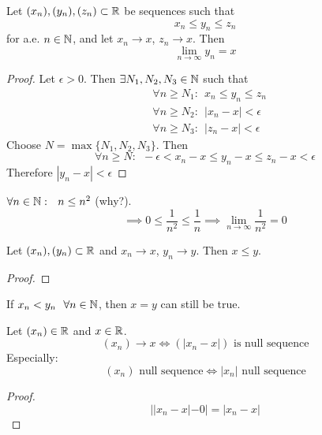 \documentclass[../../script.tex]{subfiles}
\begin{document}
\begin{thm}
Let $(x_n), (y_n), (z_n) \subset \mathbb{R}$ be sequences such that
\[
	x_n \le y_n \le z_n
\]
for a.e. $n \in \mathbb{N}$, and let $x_n \rightarrow x$, $z_n \rightarrow x$. Then
\[
	\lim_{n \rightarrow \infty} y_n = x
\]
\end{thm}
\begin{proof}
Let $\epsilon > 0$. Then $\exists N_1, N_2, N_3 \in \mathbb{N}$ such that
\begin{align}
	&\forall n \ge N_1: ~~x_n \le y_n \le z_n \\
	&\forall n \ge N_2: ~~|x_n - x| < \epsilon \\
	&\forall n \ge N_3: ~~|z_n - x| < \epsilon
\end{align}
Choose $N = \max \{N_1, N_2, N_3\}$. Then
\begin{equation}
	\forall n \ge N: ~~-\epsilon < x_n - x \le y_n - x \le z_n - x < \epsilon
\end{equation}
Therefore $|y_n - x| < \epsilon$
\end{proof}

\begin{eg}
$\forall n \in \mathbb{N}: ~~n \le n^2$ (why?).
\[
	\implies 0 \le \frac{1}{n^2} \le \frac{1}{n} \implies \lim_{n \rightarrow \infty} \frac{1}{n^2} = 0
\]
\end{eg}

\begin{thm}
Let $(x_n), (y_n) \subset \mathbb{R}$ and $x_n \rightarrow x$, $y_n \rightarrow y$. Then $x \le y$.
\end{thm}
\begin{proof}
\reader
\end{proof}

\begin{rem}
If $x_n < y_n ~~\forall n \in \mathbb{N}$, then $x=y$ can still be true.
\end{rem}

\begin{lem}\label{220}
Let $(x_n) \in \mathbb{R}$ and $x \in \mathbb{R}$.
\[
	(x_n) \longrightarrow x \iff (|x_n - x|) \text{ is null sequence}
\]
Especially:
\[
	(x_n) \text{ null sequence} \iff |x_n| \text{ null sequence}
\]
\end{lem}
\begin{proof}
\begin{equation}
	||x_n - x| - 0| = |x_n - x|
\end{equation}
\end{proof}
\end{document}
